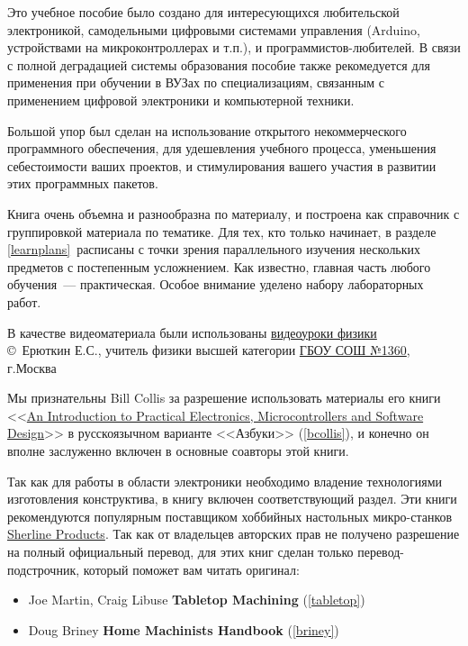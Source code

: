 
Это учебное пособие было создано для интересующихся любительской электроникой,
самодельными цифровыми системами управления (Arduino, устройствами на
микроконтроллерах и т.п.), и программистов-лю\-би\-те\-лей. В связи с полной
деградацией системы образования пособие также рекомедуется для применения при
обучении в ВУЗах по специализациям, связанным с применением цифровой электроники
и компьютерной техники.

Большой упор был сделан на использование открытого некоммерческого программного
обеспечения, для удешевления учебного процесса, уменьшения себестоимости ваших
проектов, и
стимулирования вашего участия в развитии этих программных пакетов.

Книга очень объемна и разнообразна по материалу, и построена как справочник с
группировкой материала по тематике. Для тех, кто только начинает, в разделе
\ref{learnplans}\ расписаны  с
точки зрения параллельного изучения нескольких предметов с постепенным
усложнением. Как
известно, главная часть любого обучения\ --- практическая. Особое внимание
уделено набору лабораторных работ.

\bigskip
В качестве видеоматериала были использованы 
\href{https://www.youtube.com/playlist?list=PLddc343N7YqgCWlspw08g6t0iFos9gAi4}{видеоуроки
физики}\\
\copyright\ Ерюткин Е.С., учитель физики высшей категории 
\href{http://sch1360v.mskobr.ru/}{ГБОУ СОШ №1360}, г.Москва

\bigskip
Мы признательны Bill Collis за разрешение использовать материалы его книги
<<\href{www.techideas.co.nz}{An Introduction to
Practical Electronics,
Microcontrollers and
Software Design}>> \cite{bcollis} в
русскоязычном варианте <<Азбуки>> (\ref{bcollis}), и конечно он вполне
заслуженно включен в основные соавторы этой книги.

\bigskip
Так как для работы в области электроники необходимо владение технологиями
изготовления конструктива, в книгу включен соответствующий раздел. 
Эти книги рекомендуются популярным поставщиком хоббийных настольных
микро-станков \href{http://sherline.com/}{Sherline Products}. Так как от
владельцев авторских прав не получено разрешение на полный официальный перевод,
для этих книг сделан только перевод-подстрочник, который поможет вам читать
оригинал:
\begin{itemize}
  \item Joe Martin, Craig Libuse \textbf{Tabletop Machining}
  \cite{tabletop} (\ref{tabletop})
  \item Doug Briney \textbf{Home Machinists Handbook}
  \cite{briney} (\ref{briney})
\end{itemize}

